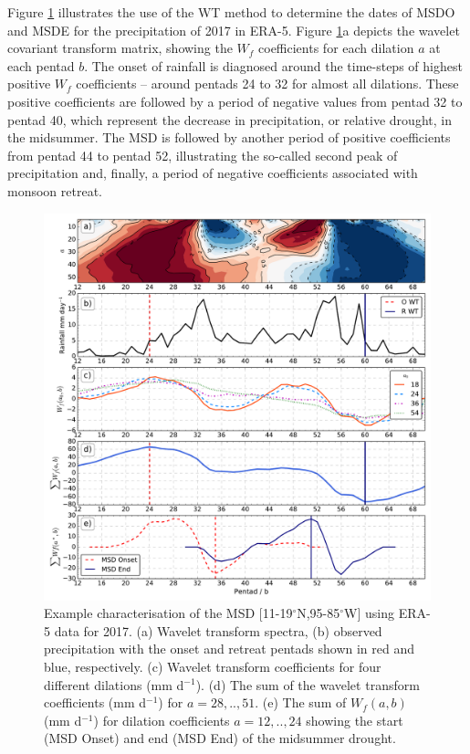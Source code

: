 Figure \ref{fig:5} illustrates the use of the WT method to determine the dates of MSDO and MSDE for the precipitation of 2017 in ERA-5.
Figure \ref{fig:5}a depicts the wavelet covariant transform matrix, showing the $W_f$ coefficients for each dilation $a$ at each pentad $b$. The onset of rainfall is diagnosed around the time-steps of highest positive $W_f$ coefficients -- around pentads 24 to 32 for almost all dilations. These positive coefficients are followed by a period of negative values from pentad 32 to pentad 40, which represent the decrease in precipitation, or relative drought, in the midsummer. The MSD is followed by another period of positive coefficients from pentad 44 to pentad 52, illustrating the so-called second peak of precipitation and, finally, a period of negative coefficients associated with monsoon retreat.

\begin{figure}[b!]
\centering
 \includegraphics[width=\linewidth]{figures/wav_fig4.pdf}
\caption[Wavelet transform characterisation of Midsummer drought]{ Example characterisation of the MSD [11-19$^\circ$N,95-85$^\circ$W] using ERA-5 data for 2017. (a) Wavelet transform spectra, (b) observed precipitation with the onset and retreat pentads shown in red and blue, respectively. (c) Wavelet transform coefficients for four different dilations (mm d$^{-1}$). (d) The sum of the wavelet transform coefficients (mm d$^{-1}$) for $a={28,..,51}$. (e) The sum of $W_f(a,b)$ (mm d$^{-1}$) for dilation coefficients $a={12,..,24}$ showing the start (MSD Onset) and end (MSD End) of the midsummer drought. }
\label{fig:5}
\end{figure}


